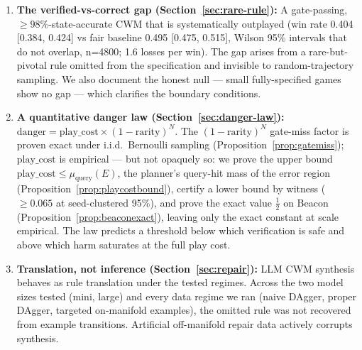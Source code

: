 \documentclass[11pt]{article}
\theoremstyle{remark}
\begin{document}
\begin{enumerate}
\item \textbf{The verified-vs-correct gap (Section~\ref{sec:rare-rule}):} A gate-passing, $\geq 98\%$-state-accurate CWM that is systematically outplayed (win rate 0.404 [0.384, 0.424] vs fair baseline 0.495 [0.475, 0.515], Wilson 95\% intervals that do not overlap, n=4800; 1.6 losses per win). The gap arises from a rare-but-pivotal rule omitted from the specification and invisible to random-trajectory sampling. We also document the honest null --- small fully-specified games show no gap --- which clarifies the boundary conditions.

\item \textbf{A quantitative danger law (Section~\ref{sec:danger-law}):} $\mathrm{danger} = \mathrm{play\_cost} \times (1 - \mathrm{rarity})^N$. The $(1 - \mathrm{rarity})^N$ gate-miss factor is proven exact under i.i.d.\ Bernoulli sampling (Proposition~\ref{prop:gatemiss}); $\mathrm{play\_cost}$ is empirical --- but not opaquely so: we prove the upper bound $\mathrm{play\_cost} \leq \mu_{\mathrm{query}}(E)$, the planner's query-hit mass of the error region (Proposition~\ref{prop:playcostbound}), certify a lower bound by witness ($\geq 0.065$ at seed-clustered 95\%), and prove the exact value $\tfrac12$ on Beacon (Proposition~\ref{prop:beaconexact}), leaving only the exact constant at scale empirical. The law predicts a threshold below which verification is safe and above which harm saturates at the full play cost.

\item \textbf{Translation, not inference (Section~\ref{sec:repair}):} LLM CWM synthesis behaves as rule translation under the tested regimes. Across the two model sizes tested (mini, large) and every data regime we ran (naive DAgger, proper DAgger, targeted on-manifold examples), the omitted rule was not recovered from example transitions. Artificial off-manifold repair data actively corrupts synthesis.


\end{enumerate}
\end{document}
